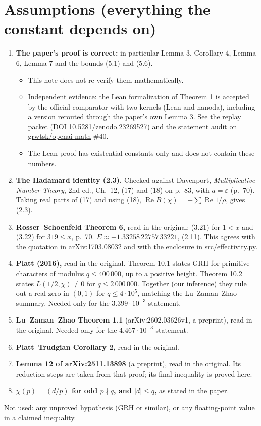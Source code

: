 \documentclass[11pt]{article}
\newcommand{\Rea}{\operatorname{Re}}
\begin{document}
\section{Assumptions (everything the constant depends on)}\label{sec:assumptions}

\begin{enumerate}
\item \textbf{The paper's proof is correct:} in particular Lemma 3, Corollary 4, Lemma 6, Lemma 7 and the bounds (5.1) and (5.6).
  \begin{itemize}
  \item This note does not re-verify them mathematically.
  \item Independent evidence: the Lean formalization of Theorem 1 is accepted by the official comparator with two kernels (Lean and nanoda), including a version rerouted through the paper's own Lemma 3. See the replay packet (DOI 10.5281/zenodo.23269527) and the statement audit on \url{grwtsk/openai-math} \#40.
  \item The Lean proof has existential constants only and does not contain these numbers.
  \end{itemize}
\item \textbf{The Hadamard identity (2.3).} Checked against Davenport, \emph{Multiplicative Number Theory}, 2nd ed., Ch.~12, (17) and (18) on p.~83, with $a=\varepsilon$ (p.~70). Taking real parts of (17) and using (18), $\Rea B(\chi) = -\sum\Rea 1/\rho$, gives (2.3).
\item \textbf{Rosser--Schoenfeld Theorem 6,} read in the original: (3.21) for $1<x$ and (3.22) for $319\le x$, p.~70. $E\approx-1.33258\,22757\,33221$, (2.11). This agrees with the quotation in arXiv:1703.08032 and with the enclosure in \url{src/effectivity.py}.
\item \textbf{Platt (2016),} read in the original. Theorem 10.1 states GRH for primitive characters of modulus $q\le 400\,000$, up to a positive height. Theorem 10.2 states $L(1/2,\chi)\ne0$ for $q\le 2\,000\,000$. Together (our inference) they rule out a real zero in $(0,1)$ for $q\le4\cdot10^5$, matching the Lu--Zaman--Zhao summary. Needed only for the $3.399\cdot10^{-3}$ statement.
\item \textbf{Lu--Zaman--Zhao Theorem 1.1} (arXiv:2602.03626v1, a preprint), read in the original. Needed only for the $4.467\cdot10^{-3}$ statement.
\item \textbf{Platt--Trudgian Corollary 2,} read in the original.
\item \textbf{Lemma 12 of arXiv:2511.13898} (a preprint), read in the original. Its reduction steps are taken from that proof; its final inequality is proved here.
\item \textbf{$\chi(p)=(d/p)$ for odd $p\nmid q$, and $|d|\le q$,} as stated in the paper.
\end{enumerate}
Not used: any unproved hypothesis (GRH or similar), or any floating-point value in a claimed inequality.
\end{document}
